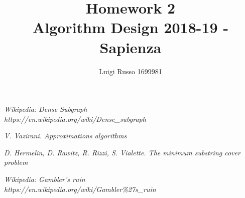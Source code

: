 \documentclass[11pt]{article}
\title{Homework 2\\
	\large Algorithm Design 2018-19 - Sapienza}
\author{Luigi Russo 1699981}
\begin{document}
	
\maketitle
\newpage
\tableofcontents
\newpage

\begin{thebibliography}{10}	
	\textsl{Wikipedia: Dense Subgraph} \\
	\textit{https://en.wikipedia.org/wiki/Dense\_subgraph}	
	
	\textsl{V. Vazirani. Approximations algorithms}

	\textsl{D. Hermelin, D. Rawitz, R. Rizzi, S. Vialette. The minimum substring cover problem}
	
	\textsl{Wikipedia: Gambler's ruin} \\
	\textit{https://en.wikipedia.org/wiki/Gambler\%27s\_ruin}
\end{thebibliography}
\end{document}
